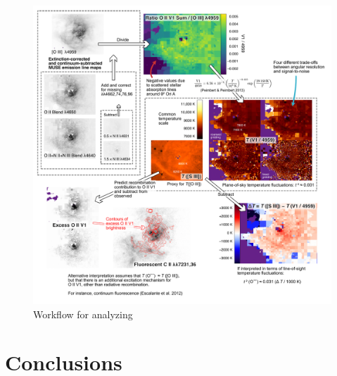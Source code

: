 \documentclass[useAMS, usenatbib]{mnras}
\begin{document}
\begin{figure}
  \centering
  \includegraphics[width=\linewidth]{figs/oii-v1-extraction-workflow}
  \caption{Workflow for analyzing  }
  \label{fig:muse-workflow}
\end{figure}



\section{Conclusions}
\label{sec:conclusions}





\bsp	%
\label{lastpage}
\end{document}
